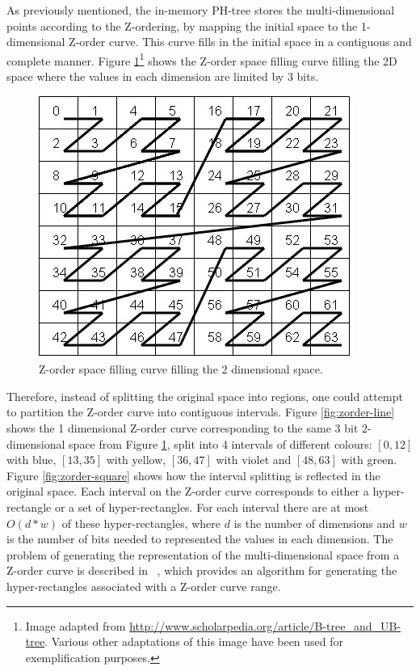 \documentclass[11pt,a4paper]{globis-book}
\begin{document}
As previously mentioned, the in-memory PH-tree stores the multi-dimensional points according to the Z-ordering, by mapping the initial space to the 1-dimensional Z-order curve. This curve fills in the initial space in a contiguous and complete manner. Figure \ref{fig:zordering-clear}\footnote{Image adapted from \url{http://www.scholarpedia.org/article/B-tree_and_UB-tree}. Various other adaptations of this image have been used for exemplification purposes. } shows the Z-order space filling curve filling the 2D space where the values in each dimension are limited by 3 bits.  

\begin{figure}[t]
    \centering
    \includegraphics[scale=0.8]{images/zordering-clear}
    \caption{Z-order space filling curve filling the 2 dimensional space.}
    \label{fig:zordering-clear}
\end{figure}

Therefore, instead of splitting the original space into regions, one could attempt to partition the Z-order curve into contiguous intervals. Figure \ref{fig:zorder-line} shows the 1 dimensional Z-order curve corresponding to the same 3 bit 2-dimensional space from Figure \ref{fig:zordering-clear}, split into 4 intervals of different colours: $[{0, 12}]$ with blue, $[13, 35]$ with yellow, $[36, 47]$ with violet and $[48, 63]$ with green. Figure \ref{fig:zorder-square} shows how the interval splitting is reflected in the original space. Each interval on the Z-order curve corresponds to either a hyper-rectangle or a set of hyper-rectangles. For each interval there are at most $O(d*w)$ of these hyper-rectangles, where $d$ is the number of dimensions and $w$ is the number of bits needed to represented the values in each dimension. The problem of generating the representation of the multi-dimensional space from a Z-order curve is described in ~\cite{skopal2006-ubtree}, which provides an algorithm for generating the hyper-rectangles associated with a Z-order curve range.
\end{document}
